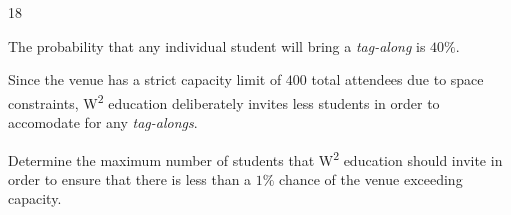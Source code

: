 \documentclass[12pt]{extarticle}
\begin{document}
\begin{shortanswer}
\begin{bookletquestion}{18}
\begin{enumerate}
			      The probability that any individual student will bring a \textit{tag-along} is $40\%$.

			      Since the venue has a strict capacity limit of $400$ total attendees due to space constraints,
			      W\textsuperscript{2} education deliberately invites less students in order to accomodate for any \textit{tag-alongs}.

			      Determine the maximum number of students that W\textsuperscript{2} education should invite in order to ensure that there is less than a $1\%$ chance of the venue exceeding capacity.
		\end{enumerate}
	\end{bookletquestion}
\end{shortanswer}
\pagebreak
\newpage
\blankpage
\newpage
\blankpage
\newpage
\blankpage
\newpage
\thispagestyle{lastpage}
\blankpage
\end{document}
